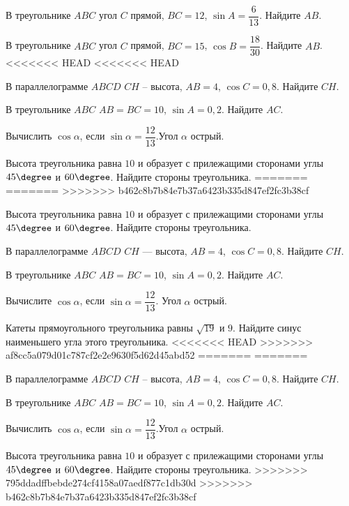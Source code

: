 \begin{homework}[number=2]
	\begin{listofex}
		\item В треугольнике \( ABC \) угол \( C \) прямой, \( BC=12 \), \( \sin A=\dfrac{6}{13} \). Найдите \( AB \).
		\item В треугольнике \( ABC \) угол \( C \) прямой, \( BC=15 \), \( \cos B=\dfrac{18}{30} \). Найдите \( AB \).
<<<<<<< HEAD
<<<<<<< HEAD
		\item  В параллелограмме \( ABCD \) \( CH \) – высота, \( AB = 4 \), \( \cos C = 0,8 \). Найдите \( CH \).
		\item  В треугольнике \( ABC \) \( AB = BC = 10 \), \( \sin A = 0,2 \). Найдите \( AC \).
		\item Вычислить \( \cos \alpha \), если \( \sin \alpha =\dfrac{12}{13}\).Угол \( \alpha \) острый.
		\item  Высота треугольника равна \( 10 \) и образует с прилежащими сторонами углы \( 45\degree \) и \( 60\degree \). Найдите стороны треугольника.
=======
=======
>>>>>>> b462c8b7b84e7b37a6423b335d847ef2fc3b38cf
		\item  Высота треугольника равна \( 10 \) и образует с прилежащими сторонами углы \( 45\degree \) и \( 60\degree \). Найдите стороны треугольника.
		\item  В параллелограмме \( ABCD \) \( CH \) --- высота, \( AB = 4 \), \( \cos C = 0,8 \). Найдите \( CH \).
		\item  В треугольнике \( ABC \) \( AB = BC = 10 \), \( \sin A = 0,2 \). Найдите \( AC \).
		\item Вычислите \( \cos \alpha \), если \( \sin \alpha =\dfrac{12}{13} \). Угол \( \alpha \) острый.
		\item Катеты прямоугольного треугольника равны \( \sqrt{19} \) и \( 9 \). Найдите синус наименьшего угла этого треугольника.
<<<<<<< HEAD
>>>>>>> af8cc5a079d01c787cf2e2e9630f5d62d45abd52
=======
=======
		\item  В параллелограмме \( ABCD \) \( CH \) – высота, \( AB = 4 \), \( \cos C = 0,8 \). Найдите \( CH \).
		\item  В треугольнике \( ABC \) \( AB = BC = 10 \), \( \sin A = 0,2 \). Найдите \( AC \).
		\item Вычислить \( \cos \alpha \), если \( \sin \alpha =\dfrac{12}{13}\).Угол \( \alpha \) острый.
		\item  Высота треугольника равна \( 10 \) и образует с прилежащими сторонами углы \( 45\degree \) и \( 60\degree \). Найдите стороны треугольника.
>>>>>>> 795ddadffbebde274cf4158a07aedf877c1db30d
>>>>>>> b462c8b7b84e7b37a6423b335d847ef2fc3b38cf
	\end{listofex}
\end{homework}

